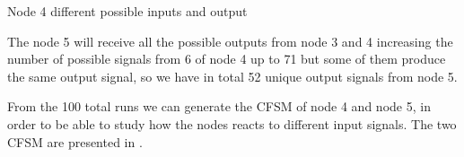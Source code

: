 \begin{table}[h]
	
	\caption{Node 4 different possible inputs and output}
	\label{tbl:fig_4_node4_possible_inputs}
\end{table}

The node \num{5} will receive all the possible outputs from node \num{3} and 
\num{4} increasing the number of possible signals from \num{6} of node \num{4}
up to \num{71} but some of them produce the same output signal, so we have in 
total \num{52} unique output signals from node \num{5}.

From the \num{100} total runs we can generate the \ac{CFSM} of node \num{4} and
node \num{5}, in order to be able to study how the nodes reacts to different
input signals.
The two \ac{CFSM} are presented in .


